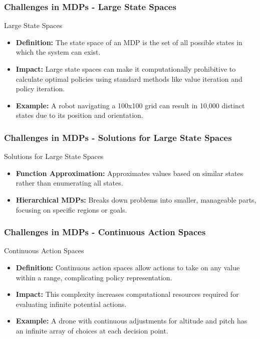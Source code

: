 \documentclass[aspectratio=169]{beamer}
\begin{document}
\begin{frame}[fragile]
  \frametitle{Challenges in MDPs - Large State Spaces}
  \begin{block}{Large State Spaces}
    \begin{itemize}
      \item \textbf{Definition:} The state space of an MDP is the set of all possible states in which the system can exist.
      \item \textbf{Impact:} Large state spaces can make it computationally prohibitive to calculate optimal policies using standard methods like value iteration and policy iteration.
      \item \textbf{Example:} A robot navigating a 100x100 grid can result in 10,000 distinct states due to its position and orientation.
    \end{itemize}
  \end{block}
\end{frame}

\begin{frame}[fragile]
  \frametitle{Challenges in MDPs - Solutions for Large State Spaces}
  \begin{block}{Solutions for Large State Spaces}
    \begin{itemize}
      \item \textbf{Function Approximation:} Approximates values based on similar states rather than enumerating all states.
      \item \textbf{Hierarchical MDPs:} Breaks down problems into smaller, manageable parts, focusing on specific regions or goals.
    \end{itemize}
  \end{block}
\end{frame}

\begin{frame}[fragile]
  \frametitle{Challenges in MDPs - Continuous Action Spaces}
  \begin{block}{Continuous Action Spaces}
    \begin{itemize}
      \item \textbf{Definition:} Continuous action spaces allow actions to take on any value within a range, complicating policy representation.
      \item \textbf{Impact:} This complexity increases computational resources required for evaluating infinite potential actions.
      \item \textbf{Example:} A drone with continuous adjustments for altitude and pitch has an infinite array of choices at each decision point.
    \end{itemize}
  \end{block}
\end{frame}
\end{document}
